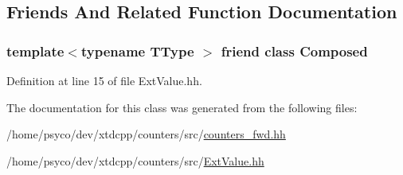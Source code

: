 \subsection{Friends And Related Function Documentation}
\subsubsection[{\texorpdfstring{Composed}{Composed}}]{\setlength{\rightskip}{0pt plus 5cm}template$<$typename T\+Type $>$ friend class {\bf Composed}\hspace{0.3cm}{\ttfamily [friend]}}\hypertarget{classxtd_1_1counters_1_1ExtValue_a93e934ad70d5b32b14beed5572450abf}{}\label{classxtd_1_1counters_1_1ExtValue_a93e934ad70d5b32b14beed5572450abf}


Definition at line 15 of file Ext\+Value.\+hh.



The documentation for this class was generated from the following files\+:\begin{DoxyCompactItemize}
\item 
/home/psyco/dev/xtdcpp/counters/src/\hyperlink{counters__fwd_8hh}{counters\+\_\+fwd.\+hh}\item 
/home/psyco/dev/xtdcpp/counters/src/\hyperlink{ExtValue_8hh}{Ext\+Value.\+hh}\end{DoxyCompactItemize}
